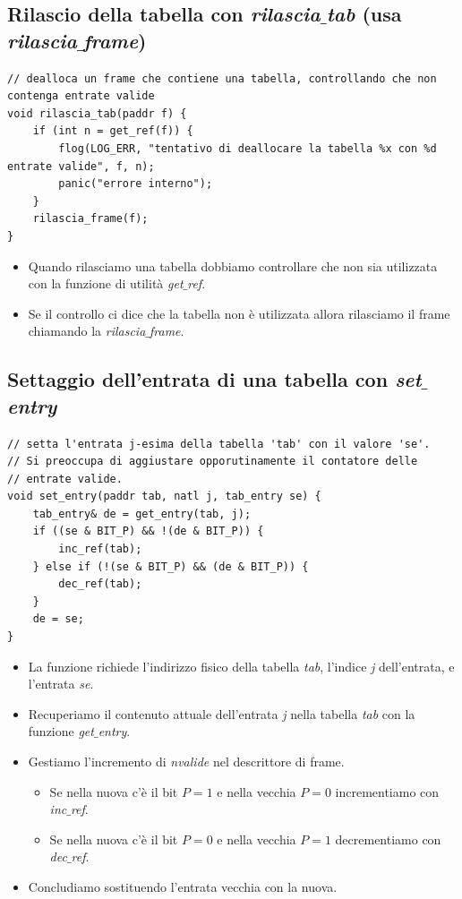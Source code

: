\documentclass[11pt]{report}
\theoremstyle{definition}
\begin{document}
\subsection{Rilascio della tabella con \emph{rilascia$\_$tab} (usa \emph{rilascia$\_$frame})}
\small 
\begin{verbatim}
// dealloca un frame che contiene una tabella, controllando che non contenga entrate valide
void rilascia_tab(paddr f) {
    if (int n = get_ref(f)) {
        flog(LOG_ERR, "tentativo di deallocare la tabella %x con %d entrate valide", f, n);
        panic("errore interno");
    }
    rilascia_frame(f);
}
\end{verbatim}
\normalsize 
\begin{itemize}
	\item Quando rilasciamo una tabella dobbiamo controllare che non sia utilizzata con la funzione di utilità \emph{get$\_$ref}.
	\item Se il controllo ci dice che la tabella non è utilizzata allora rilasciamo il frame chiamando la \emph{rilascia$\_$frame}.
\end{itemize}

\subsection{Settaggio dell'entrata di una tabella con \emph{set$\_$entry}}
\small 
\begin{verbatim}
// setta l'entrata j-esima della tabella 'tab' con il valore 'se'.
// Si preoccupa di aggiustare opporutinamente il contatore delle
// entrate valide.
void set_entry(paddr tab, natl j, tab_entry se) {
    tab_entry& de = get_entry(tab, j);
    if ((se & BIT_P) && !(de & BIT_P)) {
        inc_ref(tab);
    } else if (!(se & BIT_P) && (de & BIT_P)) {
        dec_ref(tab);
    }
    de = se;
}
\end{verbatim}
\normalsize
\begin{itemize}
	\item La funzione richiede l'indirizzo fisico della tabella \emph{tab}, l'indice \emph{j} dell'entrata, e l'entrata \emph{se}.
	\item Recuperiamo il contenuto attuale dell'entrata \emph{j} nella tabella \emph{tab} con la funzione \emph{get$\_$entry}.
	\item Gestiamo l'incremento di \emph{nvalide} nel descrittore di frame.
	\begin{itemize}
		\item Se nella nuova c'è il bit $P=1$ e nella vecchia $P=0$ incrementiamo con \emph{inc$\_$ref}.
		\item Se nella nuova c'è il bit $P=0$ e nella vecchia $P=1$ decrementiamo con \emph{dec$\_$ref}.
	\end{itemize}
	\item Concludiamo sostituendo l'entrata vecchia con la nuova.
\end{itemize}
\end{document}
